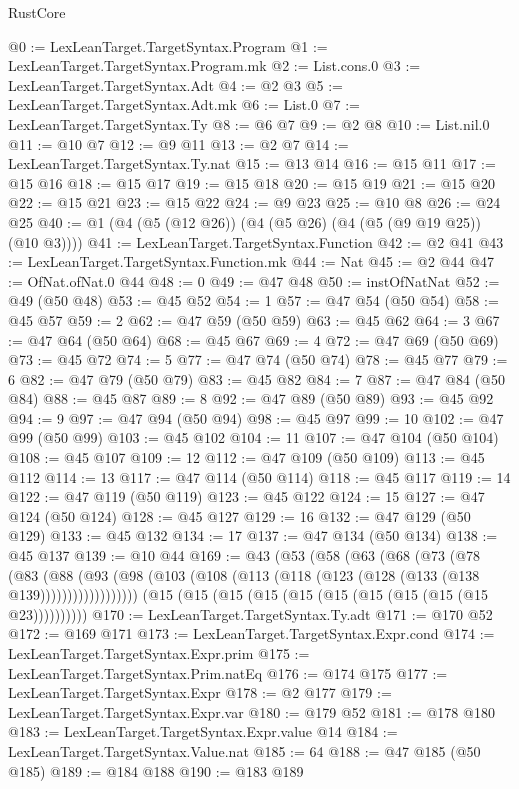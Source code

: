 \begin{lexlean}{RustCore}
\begin{coremodule}
@0 := LexLeanTarget.TargetSyntax.Program
@1 := LexLeanTarget.TargetSyntax.Program.mk
@2 := List.cons.{0}
@3 := LexLeanTarget.TargetSyntax.Adt
@4 := @2 @3
@5 := LexLeanTarget.TargetSyntax.Adt.mk
@6 := List.{0}
@7 := LexLeanTarget.TargetSyntax.Ty
@8 := @6 @7
@9 := @2 @8
@10 := List.nil.{0}
@11 := @10 @7
@12 := @9 @11
@13 := @2 @7
@14 := LexLeanTarget.TargetSyntax.Ty.nat
@15 := @13 @14
@16 := @15 @11
@17 := @15 @16
@18 := @15 @17
@19 := @15 @18
@20 := @15 @19
@21 := @15 @20
@22 := @15 @21
@23 := @15 @22
@24 := @9 @23
@25 := @10 @8
@26 := @24 @25
@40 := @1 (@4 (@5 (@12 @26)) (@4 (@5 @26) (@4 (@5 (@9 @19 @25)) (@10 @3))))
@41 := LexLeanTarget.TargetSyntax.Function
@42 := @2 @41
@43 := LexLeanTarget.TargetSyntax.Function.mk
@44 := Nat
@45 := @2 @44
@47 := OfNat.ofNat.{0} @44
@48 := 0
@49 := @47 @48
@50 := instOfNatNat
@52 := @49 (@50 @48)
@53 := @45 @52
@54 := 1
@57 := @47 @54 (@50 @54)
@58 := @45 @57
@59 := 2
@62 := @47 @59 (@50 @59)
@63 := @45 @62
@64 := 3
@67 := @47 @64 (@50 @64)
@68 := @45 @67
@69 := 4
@72 := @47 @69 (@50 @69)
@73 := @45 @72
@74 := 5
@77 := @47 @74 (@50 @74)
@78 := @45 @77
@79 := 6
@82 := @47 @79 (@50 @79)
@83 := @45 @82
@84 := 7
@87 := @47 @84 (@50 @84)
@88 := @45 @87
@89 := 8
@92 := @47 @89 (@50 @89)
@93 := @45 @92
@94 := 9
@97 := @47 @94 (@50 @94)
@98 := @45 @97
@99 := 10
@102 := @47 @99 (@50 @99)
@103 := @45 @102
@104 := 11
@107 := @47 @104 (@50 @104)
@108 := @45 @107
@109 := 12
@112 := @47 @109 (@50 @109)
@113 := @45 @112
@114 := 13
@117 := @47 @114 (@50 @114)
@118 := @45 @117
@119 := 14
@122 := @47 @119 (@50 @119)
@123 := @45 @122
@124 := 15
@127 := @47 @124 (@50 @124)
@128 := @45 @127
@129 := 16
@132 := @47 @129 (@50 @129)
@133 := @45 @132
@134 := 17
@137 := @47 @134 (@50 @134)
@138 := @45 @137
@139 := @10 @44
@169 := @43
    (@53
      (@58
        (@63
          (@68
            (@73
              (@78
                (@83
                  (@88
                    (@93 (@98 (@103 (@108 (@113 (@118 (@123 (@128 (@133 (@138 @139))))))))))))))))))
    (@15 (@15 (@15 (@15 (@15 (@15 (@15 (@15 (@15 (@15 @23))))))))))
@170 := LexLeanTarget.TargetSyntax.Ty.adt
@171 := @170 @52
@172 := @169 @171
@173 := LexLeanTarget.TargetSyntax.Expr.cond
@174 := LexLeanTarget.TargetSyntax.Expr.prim
@175 := LexLeanTarget.TargetSyntax.Prim.natEq
@176 := @174 @175
@177 := LexLeanTarget.TargetSyntax.Expr
@178 := @2 @177
@179 := LexLeanTarget.TargetSyntax.Expr.var
@180 := @179 @52
@181 := @178 @180
@183 := LexLeanTarget.TargetSyntax.Expr.value @14
@184 := LexLeanTarget.TargetSyntax.Value.nat
@185 := 64
@188 := @47 @185 (@50 @185)
@189 := @184 @188
@190 := @183 @189

\end{coremodule}
\end{lexlean}
